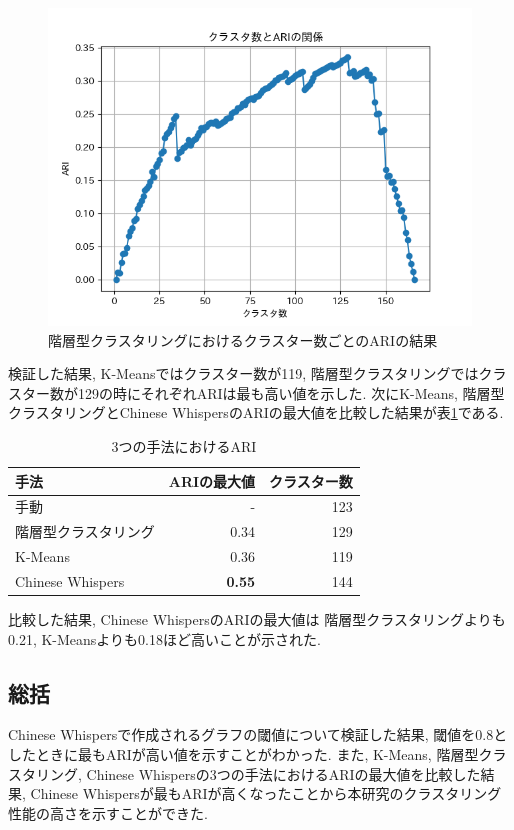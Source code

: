\begin{figure}[H]
  \centering
  \includegraphics[scale=0.8]
    {contents/images/agg_graph.png}
  \caption{階層型クラスタリングにおけるクラスター数ごとのARIの結果\label{fig:agg_graph}}
\end{figure}

検証した結果, K-Meansではクラスター数が119, 階層型クラスタリングではクラスター数が129の時にそれぞれARIは最も高い値を示した. 次にK-Means, 階層型クラスタリングとChinese WhispersのARIの最大値を比較した結果が表\ref{tb:two_ari}である. 

\begin{table}[H]
  \caption{3つの手法におけるARI}
  \label{tb:two_ari}
  \begin{center}
  \begin{tabularx}{\linewidth}{X|r|r}
    \hline
    手法&ARIの最大値&クラスター数\\\hline\hline
    手動&-&123\\\hline
    階層型クラスタリング&0.34&129\\\hline
    K-Means&0.36&119\\\hline
    Chinese Whispers&\textbf{0.55}&144\\\hline
  \end{tabularx}\end{center}
\end{table}

比較した結果, Chinese WhispersのARIの最大値は 階層型クラスタリングよりも0.21, K-Meansよりも0.18ほど高いことが示された. 

\subsection{総括}
Chinese Whispersで作成されるグラフの閾値について検証した結果, 閾値を0.8としたときに最もARIが高い値を示すことがわかった. 
また, K-Means, 階層型クラスタリング, Chinese Whispersの3つの手法におけるARIの最大値を比較した結果, Chinese Whispersが最もARIが高くなったことから本研究のクラスタリング性能の高さを示すことができた. 

